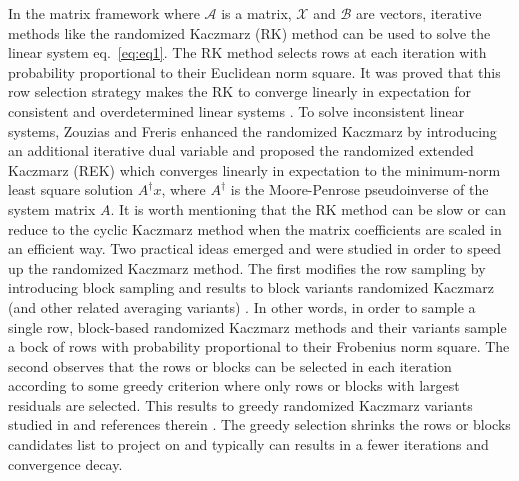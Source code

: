 \documentclass[11pt]{article}
\def\fm#1{\mathcal{#1}}
\begin{document}
In the matrix framework where $\fm A$ is a matrix, $\fm X$ and $\fm B$ are vectors,  iterative methods like the randomized Kaczmarz (RK) method can be  used to solve  the linear system  eq.~\eqref{eq:eq1}.
The RK method selects rows  at each iteration with probability proportional to their Euclidean norm square. It was proved that this row selection strategy  makes the RK to converge linearly in expectation  for consistent and overdetermined linear systems \cite{strohmer2009}.  To solve inconsistent linear systems, Zouzias and Freris \cite{zouzias2013rando} enhanced the randomized Kaczmarz by introducing an additional iterative dual variable and proposed  the randomized extended Kaczmarz (REK) which  converges linearly in expectation to  the minimum-norm least square solution $A^\dagger x$, where $A^\dagger $ is the Moore-Penrose pseudoinverse of the system matrix $A$.
It is worth mentioning that the RK method can be slow or can reduce to the cyclic Kaczmarz method when the matrix  coefficients are scaled  in an efficient way.
Two practical ideas emerged and were studied in order to speed up the randomized Kaczmarz method. The first modifies the  row sampling by introducing block sampling and results to block variants randomized Kaczmarz (and  other related averaging variants) \cite{necoara2019faste, du2020rando,tondji2023faster}. In other words, in order to sample a single row, block-based randomized Kaczmarz methods and their variants sample a bock of rows with probability proportional to their Frobenius norm square. The second observes that the rows or blocks can be selected in each iteration according to some greedy  criterion  where only rows or blocks with largest residuals are selected. This  results to greedy randomized Kaczmarz  variants studied in \cite{bai2018greed,bai2019greed,bai2021greed} and references therein . The greedy selection shrinks the rows or blocks candidates  list to project on and typically  can results in a fewer iterations and convergence decay.
\end{document}
